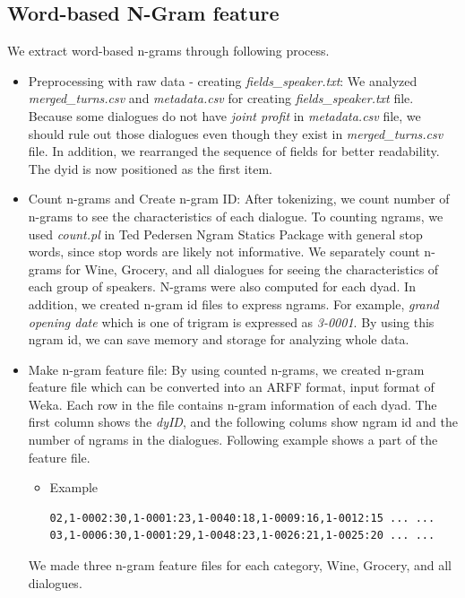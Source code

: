 \documentclass[11pt]{article} %
\begin{document}
\subsection{Word-based N-Gram feature}
We extract word-based n-grams through following process.
\begin{itemize}
\item Preprocessing with raw data - creating \textit{fields\_speaker.txt}: \newline
We analyzed \textit{merged\_turns.csv} and \textit{metadata.csv} for creating \textit{fields\_speaker.txt} file. Because some dialogues do not have \textit{joint profit} in \textit{metadata.csv} file, we should rule out those dialogues even though they exist in \textit{merged\_turns.csv} file. In addition, we rearranged the sequence of fields for better readability.  The dyid is now positioned as the first item.

\item Count n-grams and Create n-gram ID:\newline
After tokenizing, we count number of n-grams to see the characteristics of each dialogue. To counting ngrams, we used \textit{count.pl} in Ted Pedersen Ngram Statics Package with general stop words, since stop words are likely not informative. We separately count n-grams for Wine, Grocery, and all dialogues for seeing the characteristics of each group of speakers. N-grams were also computed for each dyad. \newline
In addition, we created n-gram id files to express ngrams. For example, \textit{grand opening date} which is one of trigram is expressed as \textit{3-0001}. By using this ngram id, we can save memory and storage for analyzing whole data.
\item Make n-gram feature file:\newline
By using counted n-grams, we created n-gram feature file which can be converted into an ARFF format, input format of Weka. Each row in the file contains n-gram information of each dyad. The first column shows the \textit{dyID}, and the following colums show ngram id and the number of ngrams in the dialogues. Following example shows a part of the feature file.
\begin{itemize}
\item Example
\begin{verbatim}
02,1-0002:30,1-0001:23,1-0040:18,1-0009:16,1-0012:15 ... ...
03,1-0006:30,1-0001:29,1-0048:23,1-0026:21,1-0025:20 ... ...
\end{verbatim}
\end{itemize}
We made three n-gram feature files for each category, Wine, Grocery, and all dialogues.
\end{itemize}
\end{document}
